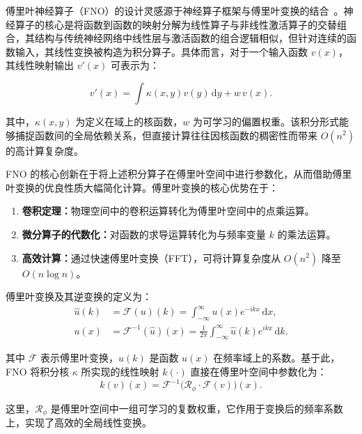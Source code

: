 傅里叶神经算子（FNO）的设计灵感源于神经算子框架与傅里叶变换的结合~\cite{zhang2025ap,chen2021solving}。神经算子的核心是将函数到函数的映射分解为线性算子与非线性激活算子的交替组合，其结构与传统神经网络中线性层与激活函数的组合逻辑相似，但针对连续的函数输入，其线性变换被构造为积分算子。具体而言，对于一个输入函数 $ v(x) $，其线性映射输出 $ v'(x) $ 可表示为：

\begin{equation}
    v'(x) = \int \kappa(x, y) v(y) \, \mathrm{d}y + w\, v(x).
\end{equation}

其中，$\kappa(x, y)$ 为定义在域上的核函数，$w$ 为可学习的偏置权重。该积分形式能够捕捉函数间的全局依赖关系，但直接计算往往因核函数的稠密性而带来 $O(n^2)$ 的高计算复杂度。

FNO 的核心创新在于将上述积分算子在傅里叶空间中进行参数化，从而借助傅里叶变换的优良性质大幅简化计算。傅里叶变换的核心优势在于：
\begin{enumerate}
    \item \textbf{卷积定理：}物理空间中的卷积运算转化为傅里叶空间中的点乘运算。
    \item \textbf{微分算子的代数化：}对函数的求导运算转化为与频率变量 $k$ 的乘法运算。
    \item \textbf{高效计算：}通过快速傅里叶变换（FFT），可将计算复杂度从 $O(n^2)$ 降至 $O(n \log n)$。
\end{enumerate}

傅里叶变换及其逆变换的定义为：
\begin{equation}
    \begin{aligned}
        \hat{u}(k) & = \mathcal{F}(u)(k) = \int_{-\infty}^{\infty} u(x) e^{-ikx} \, \mathrm{d}x,                                \\
        u(x)       & = \mathcal{F}^{-1}(\hat{u})(x) = \frac{1}{2\pi} \int_{-\infty}^{\infty} \hat{u}(k) e^{ikx} \, \mathrm{d}k.
    \end{aligned}
\end{equation}

其中 $\mathcal{F}$ 表示傅里叶变换，$\hat{u}(k)$ 是函数 $u(x)$ 在频率域上的系数。基于此，FNO 将积分核 $\kappa$ 所实现的线性映射 $k(\cdot)$ 直接在傅里叶空间中参数化为：
\begin{equation}
    k(v)(x) = \mathcal{F}^{-1} \big( \mathcal{R}_\phi \cdot \mathcal{F}(v) \big)(x).
\end{equation}

这里，$\mathcal{R}_\phi$ 是傅里叶空间中一组可学习的复数权重，它作用于变换后的频率系数上，实现了高效的全局线性变换。

